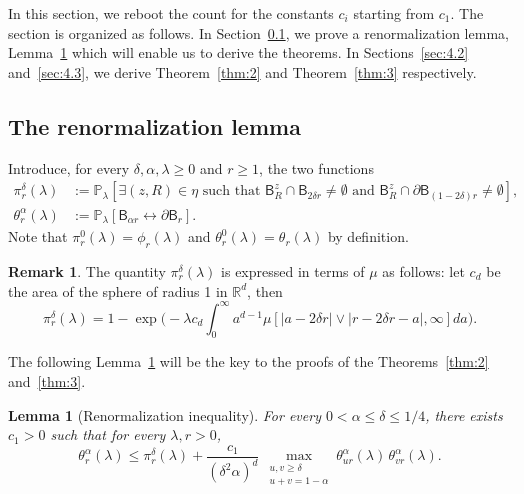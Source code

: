 \documentclass[10pt]{amsart}
\newtheorem{lemm}[theo]{Lemma}\newtheorem{prop}[theo]{Proposition}\newtheorem{coro}[theo]{Corollary}\newtheorem{conj}[theo]{Conjecture}
\theoremstyle{definition}\newtheorem{defi}[theo]{Definition}\newtheorem{rema}[theo]{Remark}\newtheorem{exam}[theo]{Example}\newtheorem{exem}[theo]{Example}\newtheorem{nota}[theo]{Notation}
\begin{document}
In this section, we reboot the count for the constants $c_i$ starting from $c_1$. The section is organized as follows. In Section~\ref{sec:4.1}, we prove a renormalization lemma, Lemma~\ref{lem:17} which will enable us to derive the theorems. In Sections~\ref{sec:4.2} and~\ref{sec:4.3}, we derive Theorem~\ref{thm:2} and Theorem~\ref{thm:3} respectively.

\subsection{The renormalization lemma}\label{sec:4.1}

Introduce, for every $\delta,\alpha,\lambda\ge0$ and $r\ge1$, the two functions
\begin{align*}
\pi_r^\delta(\lambda)&:={\mathbb P}_\lambda[\exists (z,R)\in\eta\text{ such that } \mathsf B_R^z \cap \mathsf B_{2\delta r}\ne \emptyset\text{ and }\mathsf B_R^z \cap \partial \mathsf B_{(1-2\delta)r}\ne \emptyset],\\
\theta_r^\alpha(\lambda) &:= {\mathbb P}_{\lambda} [\mathsf B_{\alpha r} \longleftrightarrow \partial \mathsf B_r].
\end{align*}
Note that $\pi_r^0(\lambda)=\phi_r(\lambda)$ and $\theta_r^0(\lambda)=\theta_r(\lambda)$ by definition.

\begin{rema}
The quantity $\pi_r^\delta(\lambda)$ is expressed in terms of $\mu$ as follows: let $c_d$ be the area of the sphere of radius 1 in ${\mathbb R}^d$, then
\begin{equation}\label{eq:p1}
\pi_r^\delta(\lambda)=1-\exp\Big(-\lambda c_d \int_0^\infty a^{d-1}\mu[|a-2\delta r|\vee |r-2\delta r-a|,\infty]da\Big).
\end{equation}
\end{rema}

The following Lemma~\ref{lem:17} will be the key to the proofs of the Theorems~\ref{thm:2} and~\ref{thm:3}.
\begin{lemm}[Renormalization inequality]\label{lem:17}
For every $0<\alpha\le \delta\le 1/4$, there exists $c_1>0$ such that for every $\lambda,r>0$,
\begin{equation}\label{eq:14}
\theta^\alpha_r (\lambda)\le \pi_r^\delta(\lambda)+\frac{c_1}{(\delta^2\alpha)^d}\,\max_{\substack{u,v\ge\delta \\ u+v=1-\alpha}}\theta^\alpha_{ur}(\lambda)\,\theta^\alpha_{vr}(\lambda).
\end{equation}
\end{lemm}
\end{document}
